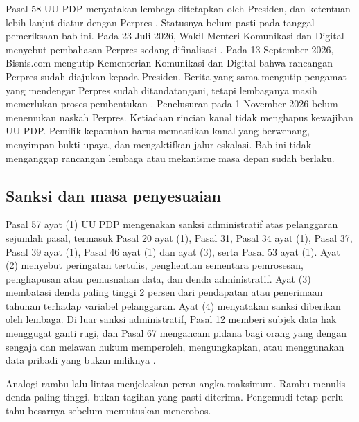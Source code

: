 Pasal 58 UU PDP menyatakan lembaga ditetapkan oleh Presiden, dan ketentuan lebih lanjut diatur
dengan Perpres \cite{uu27-2022-pdp}. Statusnya belum pasti pada tanggal pemeriksaan bab ini. Pada 23
Juli 2026, Wakil Menteri Komunikasi dan Digital menyebut pembahasan Perpres sedang difinalisasi
\cite{c07-detik-otoritas}. Pada 13 September 2026, Bisnis.com mengutip Kementerian Komunikasi dan
Digital bahwa rancangan Perpres sudah diajukan kepada Presiden. Berita yang sama mengutip pengamat
yang mendengar Perpres sudah ditandatangani, tetapi lembaganya masih memerlukan proses pembentukan
\cite{c07-bisnis-badanpdp}. Penelusuran pada 1 November 2026 belum menemukan naskah Perpres.
Ketiadaan rincian kanal tidak menghapus kewajiban UU PDP. Pemilik kepatuhan harus memastikan kanal
yang berwenang, menyimpan bukti upaya, dan mengaktifkan jalur eskalasi. Bab ini tidak menganggap
rancangan lembaga atau mekanisme masa depan sudah berlaku.

\subsection*{Sanksi dan masa penyesuaian}

Pasal 57 ayat (1) UU PDP mengenakan sanksi administratif atas pelanggaran sejumlah pasal, termasuk
Pasal 20 ayat (1), Pasal 31, Pasal 34 ayat (1), Pasal 37, Pasal 39 ayat (1), Pasal 46 ayat (1) dan
ayat (3), serta Pasal 53 ayat (1). Ayat (2) menyebut peringatan tertulis, penghentian sementara
pemrosesan, penghapusan atau pemusnahan data, dan denda administratif. Ayat (3) membatasi denda
paling tinggi 2 persen dari pendapatan atau penerimaan tahunan terhadap variabel pelanggaran. Ayat
(4) menyatakan sanksi diberikan oleh lembaga. Di luar sanksi administratif, Pasal 12 memberi subjek
data hak menggugat ganti rugi, dan Pasal 67 mengancam pidana bagi orang yang dengan sengaja dan
melawan hukum memperoleh, mengungkapkan, atau menggunakan data pribadi yang bukan miliknya
\cite{uu27-2022-pdp}.

Analogi rambu lalu lintas menjelaskan peran angka maksimum. Rambu menulis denda paling tinggi, bukan
tagihan yang pasti diterima. Pengemudi tetap perlu tahu besarnya sebelum memutuskan menerobos.

